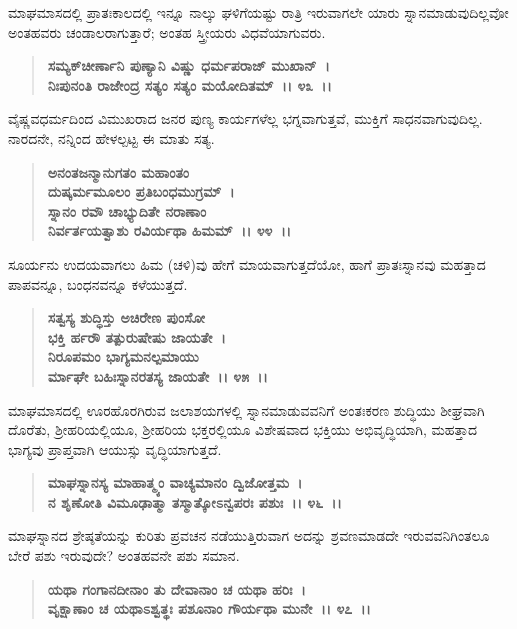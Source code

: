 ಮಾಘಮಾಸದಲ್ಲಿ ಪ್ರಾತಃಕಾಲದಲ್ಲಿ ಇನ್ನೂ ನಾಲ್ಕು ಘಳಿಗೆಯಷ್ಟು ರಾತ್ರಿ ಇರುವಾಗಲೇ ಯಾರು ಸ್ನಾನಮಾಡುವುದಿಲ್ಲವೋ ಅಂತಹವರು ಚಂಡಾಲರಾಗುತ್ತಾರೆ; ಅಂತಹ ಸ್ತ್ರೀಯರು ವಿಧವೆಯಾಗುವರು.

\begin{verse}
\textbf{ಸಮ್ಯಕ್‌ಚೀರ್ಣಾನಿ ಪುಣ್ಯಾನಿ ವಿಷ್ಣು ಧರ್ಮಪರಾಜ್ ಮುಖಾನ್~।}\\\textbf{ನಿಃಪುನಂತಿ ರಾಜೇಂದ್ರ ಸತ್ಯಂ ಸತ್ಯಂ ಮಯೋದಿತಮ್~।। ೪೩~।।}
\end{verse}

ವೈಷ್ಣವಧರ್ಮದಿಂದ ವಿಮುಖರಾದ ಜನರ ಪುಣ್ಯ ಕಾರ್ಯಗಳೆಲ್ಲ ಭಗ್ನವಾಗುತ್ತವೆ, ಮುಕ್ತಿಗೆ ಸಾಧನವಾಗುವುದಿಲ್ಲ. ನಾರದನೇ, ನನ್ನಿಂದ ಹೇಳಲ್ಪಟ್ಟ ಈ ಮಾತು ಸತ್ಯ.

\begin{verse}
\textbf{ಅನಂತಜನ್ಮಾನುಗತಂ ಮಹಾಂತಂ}\\\textbf{ದುಷ್ಕರ್ಮಮೂಲಂ ಪ್ರತಿಬಂಧಮುಗ್ರಮ್~।}\\\textbf{ಸ್ನಾನಂ ರವೌ ಚಾಭ್ಯುದಿತೇ ನರಾಣಾಂ }\\\textbf{ನಿರ್ವರ್ತಯತ್ವಾಶು ರವಿರ್ಯಥಾ ಹಿಮಮ್~।। ೪೪~।।}
\end{verse}

ಸೂರ್ಯನು ಉದಯವಾಗಲು ಹಿಮ (ಚಳಿ)ವು ಹೇಗೆ ಮಾಯವಾಗುತ್ತದೆಯೋ, ಹಾಗೆ ಪ್ರಾತಃಸ್ನಾನವು ಮಹತ್ತಾದ ಪಾಪವನ್ನೂ, ಬಂಧನವನ್ನೂ ಕಳೆಯುತ್ತದೆ.

\begin{verse}
\textbf{ಸತ್ವಸ್ಯ ಶುದ್ಧಿಸ್ತು ಅಚಿರೇಣ ಪುಂಸೋ}\\\textbf{ಭಕ್ತಿ ರ್ಹರೌ ತತ್ಪುರುಷೇಷು ಜಾಯತೇ~।}\\\textbf{ನಿರೂಪಮಂ ಭಾಗ್ಯಮನಲ್ಪಮಾಯು\enginline{-}}\\\textbf{ರ್ಮಾಘೇ ಬಹಿಃಸ್ನಾನರತಸ್ಯ ಜಾಯತೇ~।। ೪೫~।।}
\end{verse}

ಮಾಘಮಾಸದಲ್ಲಿ ಊರಹೊರಗಿರುವ ಜಲಾಶಯಗಳಲ್ಲಿ ಸ್ನಾನಮಾಡುವವನಿಗೆ ಅಂತಃ\-ಕರಣ ಶುದ್ಧಿಯು ಶೀಘ್ರವಾಗಿ ದೊರೆತು, ಶ‍್ರೀಹರಿಯಲ್ಲಿಯೂ, ಶ‍್ರೀಹರಿಯ ಭಕ್ತರಲ್ಲಿಯೂ ವಿಶೇಷವಾದ ಭಕ್ತಿಯು ಅಭಿವೃದ್ಧಿಯಾಗಿ, ಮಹತ್ತಾದ ಭಾಗ್ಯವು ಪ್ರಾಪ್ತವಾಗಿ ಆಯುಸ್ಸು ವೃದ್ಧಿಯಾಗುತ್ತದೆ.

\begin{verse}
\textbf{ಮಾಘಸ್ನಾನಸ್ಯ ಮಾಹಾತ್ಮ್ಯಂ ವಾಚ್ಯಮಾನಂ ದ್ವಿಜೋತ್ತಮ~।}\\\textbf{ನ ಶೃಣೋತಿ ವಿಮೂಢಾತ್ಮಾ ತಸ್ಮಾತ್ಕೋಽನ್ವಪರಃ ಪಶುಃ~।। ೪೬~।।}
\end{verse}

ಮಾಘಸ್ನಾನದ ಶ್ರೇಷ್ಠತೆಯನ್ನು ಕುರಿತು ಪ್ರವಚನ ನಡೆಯುತ್ತಿರುವಾಗ ಅದನ್ನು ಶ್ರವಣಮಾಡದೇ ಇರುವವನಿಗಿಂತಲೂ ಬೇರೆ ಪಶು ಇರುವುದೇ? ಅಂತಹವನೇ ಪಶು ಸಮಾನ.

\begin{verse}
\textbf{ಯಥಾ ಗಂಗಾನದೀನಾಂ ತು ದೇವಾನಾಂ ಚ ಯಥಾ ಹರಿಃ~।}\\\textbf{ವೃಕ್ಷಾಣಾಂ ಚ ಯಥಾಽಶ್ವತ್ಥಃ ಪಶೂನಾಂ ಗೌರ್ಯಥಾ ಮುನೇ~।। ೪೭~।। }
\end{verse}

